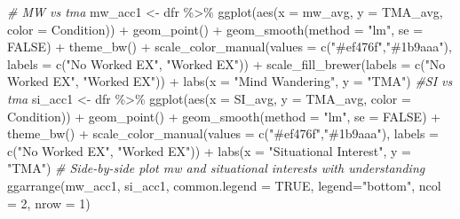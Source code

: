 \documentclass[
]{article}
\newenvironment{Shaded}{\begin{snugshade}}{\end{snugshade}}
\newcommand{\AttributeTok}[1]{\textcolor[rgb]{0.77,0.63,0.00}{#1}}
\newcommand{\CommentTok}[1]{\textcolor[rgb]{0.56,0.35,0.01}{\textit{#1}}}
\newcommand{\ConstantTok}[1]{\textcolor[rgb]{0.00,0.00,0.00}{#1}}
\newcommand{\DecValTok}[1]{\textcolor[rgb]{0.00,0.00,0.81}{#1}}
\newcommand{\FunctionTok}[1]{\textcolor[rgb]{0.00,0.00,0.00}{#1}}
\newcommand{\NormalTok}[1]{#1}
\newcommand{\OtherTok}[1]{\textcolor[rgb]{0.56,0.35,0.01}{#1}}
\newcommand{\SpecialCharTok}[1]{\textcolor[rgb]{0.00,0.00,0.00}{#1}}
\newcommand{\StringTok}[1]{\textcolor[rgb]{0.31,0.60,0.02}{#1}}
\begin{document}
\begin{Shaded}
\begin{Highlighting}[]
\CommentTok{\# MW vs tma}
\NormalTok{mw\_acc1 }\OtherTok{\textless{}{-}}\NormalTok{ dfr }\SpecialCharTok{\%\textgreater{}\%} 
          \FunctionTok{ggplot}\NormalTok{(}\FunctionTok{aes}\NormalTok{(}\AttributeTok{x =}\NormalTok{ mw\_avg, }\AttributeTok{y =}\NormalTok{ TMA\_avg, }\AttributeTok{color =}\NormalTok{ Condition)) }\SpecialCharTok{+}
          \FunctionTok{geom\_point}\NormalTok{() }\SpecialCharTok{+} \FunctionTok{geom\_smooth}\NormalTok{(}\AttributeTok{method =} \StringTok{"lm"}\NormalTok{, }\AttributeTok{se =} \ConstantTok{FALSE}\NormalTok{) }\SpecialCharTok{+}
          \FunctionTok{theme\_bw}\NormalTok{() }\SpecialCharTok{+}
          \FunctionTok{scale\_color\_manual}\NormalTok{(}\AttributeTok{values =} \FunctionTok{c}\NormalTok{(}\StringTok{"\#ef476f"}\NormalTok{,}\StringTok{"\#1b9aaa"}\NormalTok{), }\AttributeTok{labels =} 
                                  \FunctionTok{c}\NormalTok{(}\StringTok{"No Worked EX"}\NormalTok{, }\StringTok{"Worked EX"}\NormalTok{)) }\SpecialCharTok{+}
          \FunctionTok{scale\_fill\_brewer}\NormalTok{(}\AttributeTok{labels =} \FunctionTok{c}\NormalTok{(}\StringTok{"No Worked EX"}\NormalTok{, }\StringTok{"Worked EX"}\NormalTok{)) }\SpecialCharTok{+}
          \FunctionTok{labs}\NormalTok{(}\AttributeTok{x =} \StringTok{"Mind Wandering"}\NormalTok{, }\AttributeTok{y =} \StringTok{"TMA"}\NormalTok{)}
\CommentTok{\#SI vs tma}
\NormalTok{si\_acc1 }\OtherTok{\textless{}{-}}\NormalTok{ dfr }\SpecialCharTok{\%\textgreater{}\%} 
  \FunctionTok{ggplot}\NormalTok{(}\FunctionTok{aes}\NormalTok{(}\AttributeTok{x =}\NormalTok{ SI\_avg, }\AttributeTok{y =}\NormalTok{ TMA\_avg, }\AttributeTok{color =}\NormalTok{ Condition)) }\SpecialCharTok{+}
  \FunctionTok{geom\_point}\NormalTok{() }\SpecialCharTok{+} \FunctionTok{geom\_smooth}\NormalTok{(}\AttributeTok{method =} \StringTok{"lm"}\NormalTok{, }\AttributeTok{se =} \ConstantTok{FALSE}\NormalTok{) }\SpecialCharTok{+}
  \FunctionTok{theme\_bw}\NormalTok{() }\SpecialCharTok{+}
  \FunctionTok{scale\_color\_manual}\NormalTok{(}\AttributeTok{values =} \FunctionTok{c}\NormalTok{(}\StringTok{"\#ef476f"}\NormalTok{,}\StringTok{"\#1b9aaa"}\NormalTok{), }\AttributeTok{labels =} \FunctionTok{c}\NormalTok{(}\StringTok{"No Worked EX"}\NormalTok{, }\StringTok{"Worked EX"}\NormalTok{)) }\SpecialCharTok{+}
  \FunctionTok{labs}\NormalTok{(}\AttributeTok{x =} \StringTok{"Situational Interest"}\NormalTok{, }\AttributeTok{y =} \StringTok{"TMA"}\NormalTok{)}
\CommentTok{\# Side{-}by{-}side plot mw and situational interests with understanding}
\FunctionTok{ggarrange}\NormalTok{(mw\_acc1, si\_acc1, }\AttributeTok{common.legend =} \ConstantTok{TRUE}\NormalTok{, }\AttributeTok{legend=}\StringTok{"bottom"}\NormalTok{, }\AttributeTok{ncol =} \DecValTok{2}\NormalTok{, }\AttributeTok{nrow =} \DecValTok{1}\NormalTok{)}
\end{Highlighting}
\end{Shaded}
\end{document}
